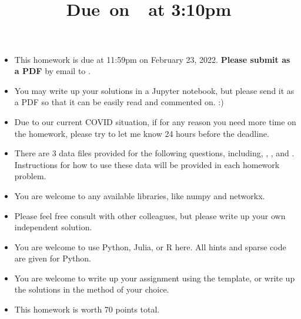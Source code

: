 \documentclass{article}
\title{
    \vspace{2in}
    \textmd{\textbf{\hmwkClass\hmwkTitle}}\\
    \normalsize\vspace{0.1in}\small{Due\ on\ \hmwkDueDate\ at 3:10pm}\\
    \vspace{3in}
}
\author{\hmwkAuthorName}
\date{}
\begin{document}

\begin{itemize}
\item This homework is due at 11:59pm on February 23, 2022. {\bf Please submit as a PDF} by email to . 
\item You may write up your solutions in a Jupyter notebook, but please send it as a PDF so that it can be easily read and commented on. :) 
\item Due to our current COVID situation, if for any reason you need more time on the homework, please try to let me know 24 hours before the deadline. 
\item There are 3 data files provided for the following questions, including, , , and . Instructions for how to use these data will be provided in each homework problem. 
\item You are welcome to any available libraries, like numpy and networkx.
\item Please feel free consult with other colleagues, but please write up your own independent solution. 
\item You are welcome to use Python, Julia, or R here. All hints and sparse code are given for Python.
\item You are welcome to write up your assignment using the  template, or write up the solutions in the method of your choice. 
\item This homework is worth 70 points total. 
\end{itemize}
\end{document}
